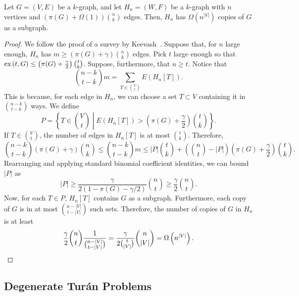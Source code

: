 \begin{theorem} \label{thm:supersaturation}
    Let $G = (V, E)$ be a $k$-graph, and let $H_n = (W, F)$ be a $k$-graph with $n$ vertices
    and $\left(\pi(G) + \Omega(1) \right) \binom{n}{k}$ edges.
    Then, $H_n$ has $\Omega \left(n^{|V|} \right)$ copies of $G$ as a subgraph.
    \begin{proof}
        We follow the proof of a survey by Keevash~\cite{keevash2011hypergraph}.
        Suppose that, for $n$ large enough, $H_n$ has $ m \geq (\pi(G) + \gamma) \binom{n}{k}$ edges.
        Pick $t$ large enough so that $\text{ex} \left( t, G \right) \leq \left(\pi(G) + \frac{\gamma}{2}\right) \binom{t}{k}$.
        Suppose, furthermore, that $n \geq t$.
        Notice that
        \[
            \binom{n-k}{t-k}m = \sum_{T \in \binom{V}{t}} E(H_n[T]).
        \]
        This is because, for each edge in $H_n$, we can choose a set $T \subset V$ containing it in
        $\binom{n-k}{t-k}$ ways.
        We define
        \[
            P = \left\{ T \in \binom{V}{t} \middle| E(H_n[T]) > \left(\pi(G) + \frac{\gamma}{2}\right) \binom{t}{k} \right\}.
        \]
        If $T \in \binom{V}{t}$, the number of edges in $H_n[T]$ is at most $\binom{t}{k}$.
        Therefore,
        \[
            \binom{n-k}{t-k}(\pi(G) + \gamma)\binom{n}{k}
            \leq \binom{n-k}{t-k}m
            \leq |P| \binom{t}{k} + \left(\binom{n}{t} - |P|\right) \left(\pi(G) + \frac{\gamma}{2}\right) \binom{t}{k}.
        \]
        Rearranging and applying standard binomial coefficient identities, we can bound $|P|$ as
        \[
            |P| \geq \frac{\gamma}{2(1 - \pi(G)- \gamma /2)} \binom{n}{t} \geq \frac{\gamma}{2} \binom{n}{t}.
        \]
        Now, for each $T \in P$, $H_n[T]$ contains $G$ as a subgraph.
        Furthermore, each copy of $G$ is in at most $\binom{n - |V|}{t - |V|}$
        such sets.
        Therefore, the number of copies of $G$ in $H_n$ is at least
        \[
            \frac{\gamma}{2} \binom{n}{t} \frac{1}{\binom{n - |V|}{t - |V|}}
            = \frac{\gamma}{2 \binom{t}{|V|}} \binom{n}{|V|}
            = \Omega\left( n^{|V|}\right). \qedhere
        \]
    \end{proof}
\end{theorem}

\subsection{Degenerate Turán Problems}\label{subsec:degenerate}

